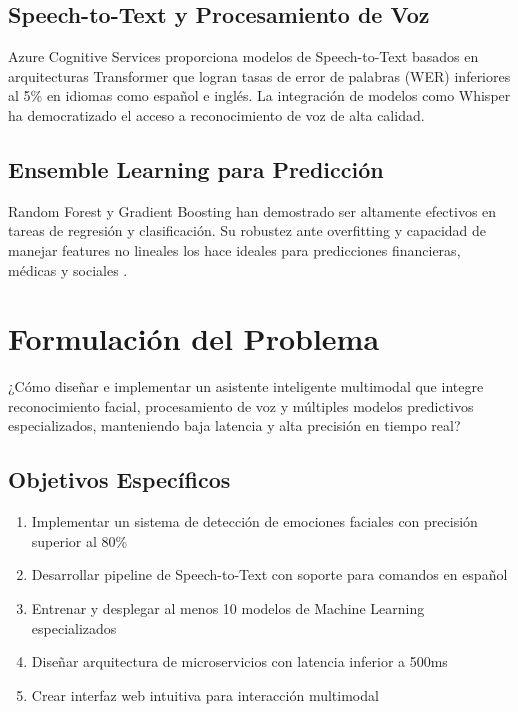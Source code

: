 \subsection{Speech-to-Text y Procesamiento de Voz}

Azure Cognitive Services \cite{azure2023speech} proporciona modelos de Speech-to-Text basados en arquitecturas Transformer que logran tasas de error de palabras (WER) inferiores al 5\% en idiomas como español e inglés. La integración de modelos como Whisper \cite{radford2022whisper} ha democratizado el acceso a reconocimiento de voz de alta calidad.

\subsection{Ensemble Learning para Predicción}

Random Forest \cite{breiman2001random} y Gradient Boosting \cite{friedman2001greedy} han demostrado ser altamente efectivos en tareas de regresión y clasificación. Su robustez ante overfitting y capacidad de manejar features no lineales los hace ideales para predicciones financieras, médicas y sociales \cite{chen2016xgboost}.

\section{Formulación del Problema}

¿Cómo diseñar e implementar un asistente inteligente multimodal que integre reconocimiento facial, procesamiento de voz y múltiples modelos predictivos especializados, manteniendo baja latencia y alta precisión en tiempo real?

\subsection{Objetivos Específicos}

\begin{enumerate}
    \item Implementar un sistema de detección de emociones faciales con precisión superior al 80\%
    \item Desarrollar pipeline de Speech-to-Text con soporte para comandos en español
    \item Entrenar y desplegar al menos 10 modelos de Machine Learning especializados
    \item Diseñar arquitectura de microservicios con latencia inferior a 500ms
    \item Crear interfaz web intuitiva para interacción multimodal
\end{enumerate}
